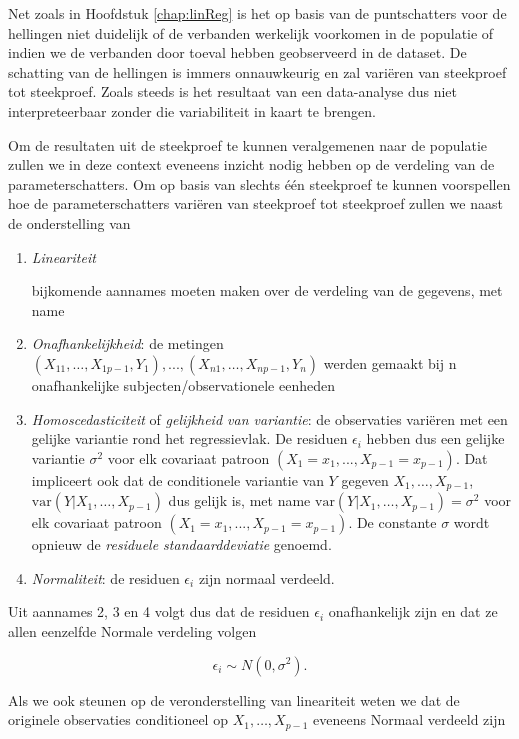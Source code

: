 \documentclass[
  12pt,dutch,coursenotes]{book}
\theoremstyle{definition}
\theoremstyle{definition}
\theoremstyle{definition}
\theoremstyle{remark}
\begin{document}
Net zoals in Hoofdstuk \ref{chap:linReg} is het op basis van de puntschatters voor de hellingen niet duidelijk of de verbanden werkelijk voorkomen in de populatie of indien we de verbanden door toeval hebben geobserveerd in de dataset.
De schatting van de hellingen is immers onnauwkeurig en zal variëren van steekproef tot steekproef.
Zoals steeds is het resultaat van een data-analyse dus niet interpreteerbaar zonder die variabiliteit in kaart te brengen.

Om de resultaten uit de steekproef te kunnen veralgemenen naar de populatie zullen we in deze context eveneens inzicht nodig hebben op de verdeling van de parameterschatters.
Om op basis van slechts één steekproef te kunnen voorspellen hoe de parameterschatters variëren van steekproef tot steekproef zullen we naast de onderstelling van

\begin{enumerate}
\def\labelenumi{\arabic{enumi}.}
\item
  \emph{Lineariteit}

  bijkomende aannames moeten maken over de verdeling van de gegevens, met name
\item
  \emph{Onafhankelijkheid}: de metingen \((X_{11},\dots, X_{1p-1}, Y_1), ..., (X_{n1},\ldots,X_{np-1},Y_n)\) werden gemaakt bij n onafhankelijke subjecten/observationele eenheden
\item
  \emph{Homoscedasticiteit} of \emph{gelijkheid van variantie}: de observaties variëren met een gelijke variantie rond het regressievlak. De residuen \(\epsilon_i\) hebben dus een gelijke variantie \(\sigma^2\) voor elk covariaat patroon \((X_1=x_1, ..., X_{p-1}=x_{p-1})\). Dat impliceert ook dat de conditionele variantie van \(Y\) gegeven \(X_1,\ldots,X_{p-1}\), \(\text{var}(Y\vert X_1,\ldots,X_{p-1})\) dus gelijk is, met name \(\text{var}(Y\vert X_1,\ldots,X_{p-1}) = \sigma^2\) voor elk covariaat patroon \((X_1=x_1, ..., X_{p-1}=x_{p-1})\). De constante \(\sigma\) wordt opnieuw de \emph{residuele standaarddeviatie} genoemd.
\item
  \emph{Normaliteit}: de residuen \(\epsilon_i\) zijn normaal verdeeld.
\end{enumerate}

Uit aannames 2, 3 en 4 volgt dus dat de residuen \(\epsilon_i\) onafhankelijk zijn en dat ze allen eenzelfde Normale verdeling volgen

\[\epsilon_i \sim N(0,\sigma^2).\]

Als we ook steunen op de veronderstelling van lineariteit weten we dat de originele observaties conditioneel op \(X_1,\ldots,X_{p-1}\) eveneens Normaal verdeeld zijn
\end{document}
